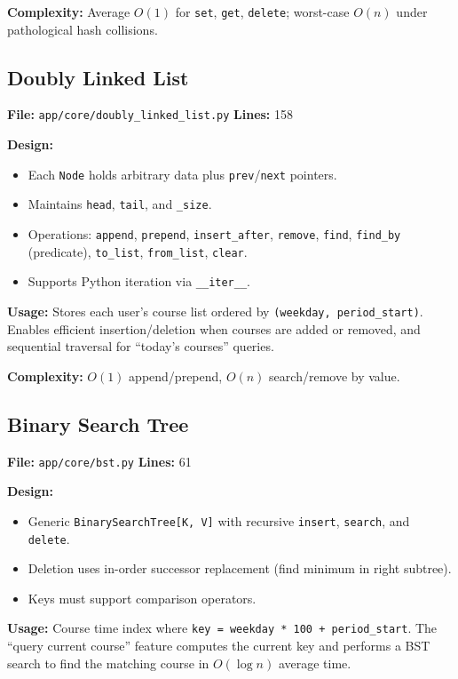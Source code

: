 \documentclass[12pt,a4paper]{article}
\begin{document}
\textbf{Complexity:} Average $O(1)$ for \texttt{set}, \texttt{get}, \texttt{delete}; worst-case $O(n)$ under pathological hash collisions.

\subsection{Doubly Linked List}

\textbf{File:} \texttt{app/core/doubly\_linked\_list.py} \quad \textbf{Lines:} 158

\textbf{Design:}
\begin{itemize}[nosep]
    \item Each \texttt{Node} holds arbitrary data plus \texttt{prev}/\texttt{next} pointers.
    \item Maintains \texttt{head}, \texttt{tail}, and \texttt{\_size}.
    \item Operations: \texttt{append}, \texttt{prepend}, \texttt{insert\_after}, \texttt{remove}, \texttt{find}, \texttt{find\_by} (predicate), \texttt{to\_list}, \texttt{from\_list}, \texttt{clear}.
    \item Supports Python iteration via \texttt{\_\_iter\_\_}.
\end{itemize}

\textbf{Usage:} Stores each user's course list ordered by \texttt{(weekday, period\_start)}. Enables efficient insertion/deletion when courses are added or removed, and sequential traversal for ``today's courses'' queries.

\textbf{Complexity:} $O(1)$ append/prepend, $O(n)$ search/remove by value.

\subsection{Binary Search Tree}

\textbf{File:} \texttt{app/core/bst.py} \quad \textbf{Lines:} 61

\textbf{Design:}
\begin{itemize}[nosep]
    \item Generic \texttt{BinarySearchTree[K, V]} with recursive \texttt{insert}, \texttt{search}, and \texttt{delete}.
    \item Deletion uses in-order successor replacement (find minimum in right subtree).
    \item Keys must support comparison operators.
\end{itemize}

\textbf{Usage:} Course time index where \texttt{key = weekday * 100 + period\_start}. The ``query current course'' feature computes the current key and performs a BST search to find the matching course in $O(\log n)$ average time.
\end{document}
